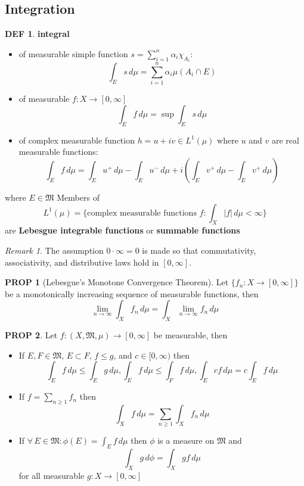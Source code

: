 \documentclass[hidelinks,10pt]{article}
\theoremstyle{definition}
\newtheorem*{defin}{DEF}
\theoremstyle{dotles}
\theoremstyle{dotless}
\newtheorem{proposition}{PROP}[section]
\theoremstyle{remark}
\newtheorem*{remark}{Remark}
\begin{document}
\subsection{Integration}

\begin{defin}
\textbf{integral}\begin{itemize}
    \item of measurable simple function $s=\sum_{i=1}^n\alpha_i\chi_{A_i}$:
    \[\int_Es\,d\mu=\sum\limits_{i=1}^n\alpha_i\mu(A_i\cap E)\]
    \item of measurable $f:X\to[0,\infty]$
    \[\int_Ef\,d\mu=\sup\int_Es\,d\mu\]
    \item of complex measurable function $h=u+iv\in L^1(\mu)$ where $u$ and $v$ are real measurable functions:
    \[\int_Ef\,d\mu=\int_Eu^+\,d\mu-\int_Eu^-\,d\mu+i\left(\int_Ev^+\,d\mu-\int_Ev^+\,d\mu\right)\]
\end{itemize}
where $E\in\mathfrak{M}$\bigbreak
Members of
\[L^1(\mu)=\{\textrm{complex measurable functions }f:\int_X|f|\,d\mu<\infty\}\]
are \textbf{Lebesgue integrable functions} or \textbf{summable functions}
\end{defin}

\begin{remark}
The assumption $0\cdot\infty=0$ is made so that commutativity, associativity, and distributive laws hold in $[0,\infty]$.
\end{remark}

\begin{proposition}[Lebesgue's Monotone Convergence Theorem]
Let $\{f_n:X\to[0,\infty]\}$ be a monotonically increasing sequence of measurable functions, then
\[\lim_{n\to\infty}\int_Xf_n\,d\mu=\int_X\lim_{n\to\infty}f_n\,d\mu\]
\end{proposition}

\begin{proposition}\label{Prop 1.7}
Let $f:(X,\mathfrak{M},\mu)\to[0,\infty]$ be measurable, then\begin{itemize}
    \item If $E,F\in\mathfrak{M}$, $E\subset F$, $f\leq g$, and $c\in[0,\infty)$ then
    \[\int_Ef\,d\mu\leq\int_Eg\,d\mu,\int_Ef\,d\mu\leq\int_Ff\,d\mu,\int_Ecf\,d\mu=c\int_Ef\,d\mu\]
    \item If $f=\sum_{n\geq1}f_n$ then
    \[\int_Xf\,d\mu=\sum_{n\geq1}\int_Xf_n\,d\mu\]
    \item If $\forall\,E\in\mathfrak{M}:\phi(E)=\int_Ef\,d\mu$ then $\phi$ is a measure on $\mathfrak{M}$ and
    \[\int_Xg\,d\phi=\int_Xgf\,d\mu\]
    for all measurable $g:X\to[0,\infty]$
\end{itemize}
\end{proposition}
\end{document}
